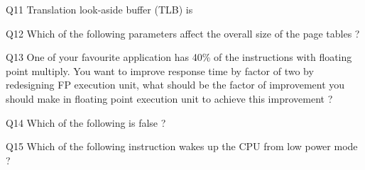 \documentclass[a4paper]{article}
\begin{document}
{\begin{question}{Q11}
  Translation look-aside buffer (TLB) is   
  \begin{choices}
  \end{choices}
\end{question}


\begin{question}{Q12}
  Which of the following parameters affect the overall size of the page tables ?  
  \begin{choices}
  \end{choices}
\end{question}


\begin{question}{Q13}
  One of your favourite application has 40\% of the instructions with floating point multiply. You want to improve response time by factor of two by redesigning FP execution unit,  what should be the factor of improvement you should make in floating point execution unit to achieve this improvement ?
  \begin{choices}
  \end{choices}
\end{question}


\begin{question}{Q14}
  Which of the following is false ?
  \begin{choices}
  \end{choices}
\end{question}


\begin{question}{Q15}
  Which of the following instruction wakes up the CPU from low power mode ?
  \begin{choices}
  \end{choices}
\end{question}


}
\end{document}
